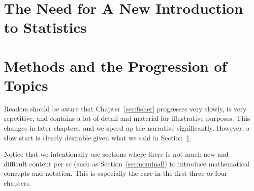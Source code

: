 \addchap{\lsPrefaceTitle}

\section{The Need for A New Introduction to Statistics}\label{sec:need}

\section{Methods and the Progression of Topics}

Readers should be aware that Chapter~\ref{sec:fisher} progresses very slowly, is very repetitive, and contains a lot of detail and material for illustrative purposes.
This changes in later chapters, and we speed up the narrative significantly.
However, a slow start is clearly desirable given what we said in Section~\ref{sec:need}.

Notice that we intentionally use sections where there is not much new and difficult content per se (such as Section~\ref{sec:nominal}) to introduce mathematical concepts and notation.
This is especially the case in the first three or four chapters.


